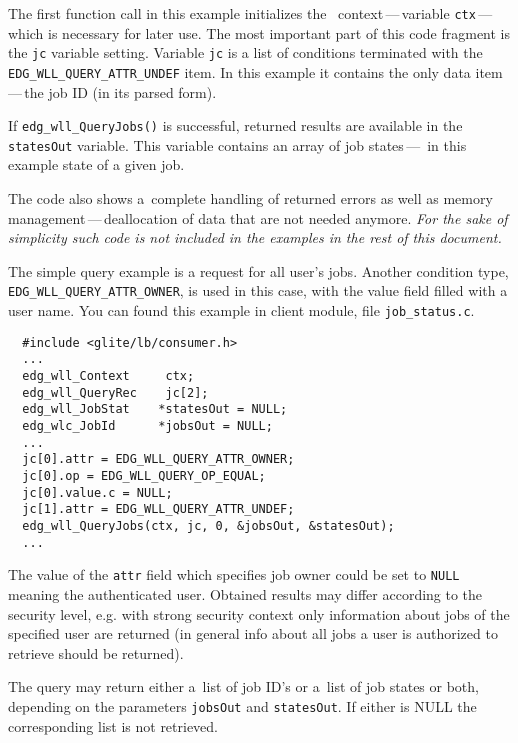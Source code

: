 The first function call in this example initializes the \LB\ context\,---\,variable
\texttt{ctx}\,---\,which is necessary for later use. The most important part
of this code fragment is the \texttt{jc} variable setting.
Variable \texttt{jc} is a list of conditions terminated with the 
\texttt{EDG\_WLL\_QUERY\_ATTR\_UNDEF} item.
In this example it contains the only data item\,---\,the job ID
(in its parsed form).

If \texttt{edg\_wll\_QueryJobs()} is successful, returned results are available 
in the \texttt{statesOut} variable. This variable contains an array of job states\,---\,
in this example state of a given job.

The code also shows a~complete handling of returned errors as well as memory
management\,---\,deallocation of data that are not needed anymore.
\emph{For the sake of simplicity such code is not included in the examples
in the rest of this document.}

\label{JQ-auj}

The simple query example is a request for all user's jobs. Another
condition type, \\
\texttt{EDG\_WLL\_QUERY\_ATTR\_OWNER}, is used in this case, with the 
value field filled with a user name. You can found this example in client module, file \texttt{job\_status.c}.

\begin{verbatim}
  #include <glite/lb/consumer.h>
  ...
  edg_wll_Context     ctx;    
  edg_wll_QueryRec    jc[2];
  edg_wll_JobStat    *statesOut = NULL;
  edg_wlc_JobId      *jobsOut = NULL;
  ...
  jc[0].attr = EDG_WLL_QUERY_ATTR_OWNER;
  jc[0].op = EDG_WLL_QUERY_OP_EQUAL;
  jc[0].value.c = NULL;
  jc[1].attr = EDG_WLL_QUERY_ATTR_UNDEF;
  edg_wll_QueryJobs(ctx, jc, 0, &jobsOut, &statesOut);
  ...
\end{verbatim}

The value of the \texttt{attr} field which specifies job owner
could be set to \texttt{NULL} meaning the authenticated user.
Obtained results may differ according to the security level, e.g. with strong security
context only information about jobs of the specified user are returned
(in general info about all jobs a user is authorized to retrieve should be
returned).

The query may return either a~list of job ID's or a~list of job states or both,
depending on the parameters \texttt{jobsOut} and \texttt{statesOut}.
If either is NULL the corresponding list is not retrieved.

